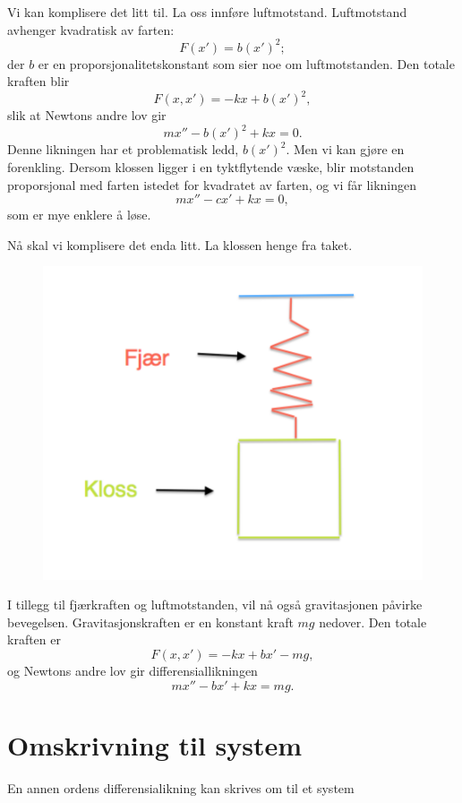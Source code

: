 Vi kan komplisere det litt til. La oss innf{\o}re luftmotstand. Luftmotstand avhenger kvadratisk av farten:
\begin{equation*}
F(x')=b(x')^{2};
\end{equation*}
der $b$ er en proporsjonalitetskonstant som sier noe om luftmotstanden. 
Den totale kraften blir
\begin{equation*}
F(x,x')=-kx+b(x')^{2},
\end{equation*}
slik at Newtons andre lov gir
\begin{equation*}
mx''-b(x')^{2} +kx=0.
\end{equation*}
Denne likningen har et problematisk ledd, $b(x')^{2}$. Men vi kan gjøre en forenkling. 
Dersom klossen ligger i en tyktflytende væske, blir motstanden proporsjonal med farten istedet for kvadratet av farten, 
og vi får likningen
\begin{equation*}
mx''-cx' +kx=0,
\end{equation*}
som er mye enklere å løse.



N{\aa} skal vi komplisere det enda litt. La klossen henge fra taket.
\begin{figure}[htbp]
  \begin{center}
	\includegraphics[scale=.4]{Hooke_2.pdf}
	\label{fig:Num1}
	\end{center}
\end{figure}
I tillegg til fj{\ae}rkraften og luftmotstanden, vil n{\aa} ogs{\aa} gravitasjonen p{\aa}virke bevegelsen. Gravitasjonskraften er en konstant kraft $mg$ nedover. Den totale kraften
er
\begin{equation*}
F(x,x')=-kx+bx'-mg,
\end{equation*}
og Newtons andre lov gir differensiallikningen
\begin{equation*}
mx''-bx' +kx=mg.
\end{equation*}





\section*{Omskrivning til system}
En annen ordens differensialikning kan skrives om til et system 
\kapittelslutt
